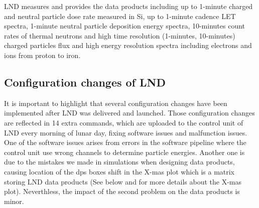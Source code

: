 \ac{LND} measures and provides the data products including up to 1-minute charged and neutral particle dose rate measured in Si, up to 1-minute cadence \ac{LET} spectra, 1-minute neutral particle deposition energy spectra, 10-minutes count rates of thermal neutrons and high time resolution (1-minutes, 10-minutes) charged particles flux and high energy resolution spectra including electrons and ions from proton to iron.


\subsection{Configuration changes of LND}

It is important to highlight that several configuration changes have been implemented after \ac{LND} was delivered and launched. Those configuration changes are reflected in 14 extra commands, which are uploaded to the control unit of \ac{LND} every morning of lunar day, fixing software issues and malfunction issues. One of the software issues arises from errors in the software pipeline where the control unit use wrong channels to determine particle energies. Another one is due to the mistakes we made in simulations when designing data products, causing location of the \ac{dps} boxes shift in the X-mas plot which is a matrix storing \ac{LND} data products (See below and \citet{Wimmer-2020-LND} for more details about the X-mas plot). Neverthless, the impact of the second problem on the data products is minor. 

